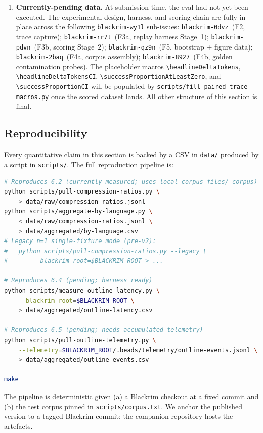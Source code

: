 \begin{enumerate}[leftmargin=*,nosep]
  \item \textbf{Currently-pending data.}  At submission time, the
        eval had not yet been executed.  The experimental design,
        harness, and scoring chain are fully in place across the
        following \texttt{blackrim-wy1l} sub-issues:
        \texttt{blackrim-0dvz}~(F2, trace capture);
        \texttt{blackrim-rr7t}~(F3a, replay harness Stage~1);
        \texttt{blackrim-pdvn}~(F3b, scoring Stage~2);
        \texttt{blackrim-qz9n}~(F5, bootstrap + figure data);
        \texttt{blackrim-2baq}~(F4a, corpus assembly);
        \texttt{blackrim-8927}~(F4b, golden contamination probes).
        The placeholder macros \verb|\headlineDeltaTokens|,
        \verb|\headlineDeltaTokensCI|,
        \verb|\successProportionAtLeastZero|, and
        \verb|\successProportionCI| will be populated by
        \texttt{scripts/fill-paired-trace-macros.py} once the scored
        dataset lands.  All other structure of this section is final.
\end{enumerate}

\subsection{Reproducibility}
\label{sec:repro}

Every quantitative claim in this section is backed by a CSV in
\texttt{data/} produced by a script in \texttt{scripts/}. The full
reproduction pipeline is:

\begin{lstlisting}[language=bash]
# Reproduces 6.2 (currently measured; uses local corpus-files/ corpus)
python scripts/pull-compression-ratios.py \
    > data/raw/compression-ratios.jsonl
python scripts/aggregate-by-language.py \
    < data/raw/compression-ratios.jsonl \
    > data/aggregated/by-language.csv
# Legacy n=1 single-fixture mode (pre-v2):
#   python scripts/pull-compression-ratios.py --legacy \
#       --blackrim-root=$BLACKRIM_ROOT > ...

# Reproduces 6.4 (pending; harness ready)
python scripts/measure-outline-latency.py \
    --blackrim-root=$BLACKRIM_ROOT \
    > data/aggregated/outline-latency.csv

# Reproduces 6.5 (pending; needs accumulated telemetry)
python scripts/pull-outline-telemetry.py \
    --telemetry=$BLACKRIM_ROOT/.beads/telemetry/outline-events.jsonl \
    > data/aggregated/outline-events.csv

make
\end{lstlisting}

The pipeline is deterministic given (a) a Blackrim checkout at a
fixed commit and (b) the test corpus pinned in
\texttt{scripts/corpus.txt}. We anchor the published version to a
tagged Blackrim commit; the companion repository
\cite{blackrim_paper_repo} hosts the artefacts.
